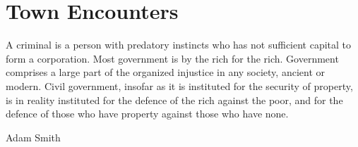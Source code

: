 \section{Town Encounters}


\epigraph{A criminal is a person with predatory instincts who has not sufficient capital to form a corporation. Most government is by the rich for the rich.
Government comprises a large part of the organized injustice in any society, ancient or modern.
Civil government, insofar as it is instituted for the security of property, is in reality instituted for the defence of the rich against the poor, and for the defence of those who have property against those who have none.}%
{Adam Smith}


\renewcommand{\sqarea}{Town}

\setcounter{encnum}{1}

